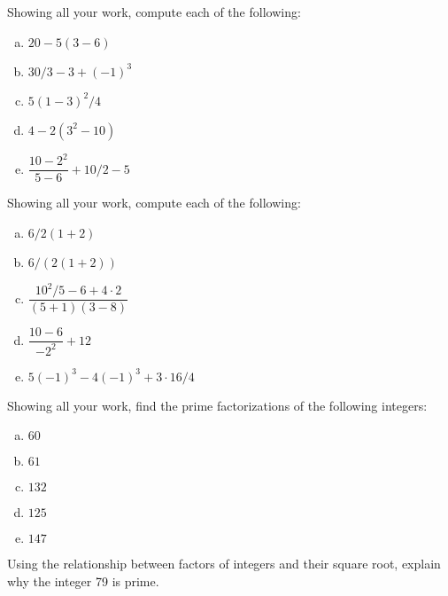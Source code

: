 \documentclass[11pt,letterpaper]{article}
\begin{document}

 Showing all your work, compute each of the following:
\begin{enumerate}[(a)]
\item $20 - 5(3 - 6)$ 
\item $30/3 - 3 + (-1)^3$
\item $5(1 - 3)^2/4$
\item $4 - 2(3^2 - 10)$
\item $\dfrac{10 - 2^2}{5 - 6} + 10/2 - 5$
\end{enumerate}



\newpage



 Showing all your work, compute each of the following:
\begin{enumerate}[(a)]
\item $6/2(1 + 2)$
\item $6/(2(1+2))$
\item $\dfrac{10^2/5 - 6 + 4 \cdot 2}{(5 + 1)(3 - 8)}$
\item $\dfrac{10 - 6}{-2^2} + 12$
\item $5(-1)^3 - 4(-1)^3 + 3 \cdot 16/4$
\end{enumerate}



\newpage



 Showing all your work, find the prime factorizations of the following integers:
\begin{enumerate}[(a)]
\item $60$
\item $61$
\item $132$
\item $125$
\item $147$
\end{enumerate}



\newpage



 Using the relationship between factors of integers and their square root, explain why the integer 79 is prime. \pspace



\newpage
\end{document}
